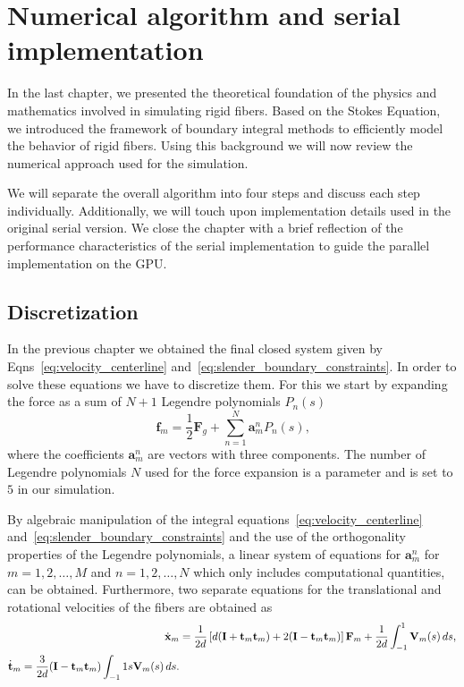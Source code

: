 \chapter{Numerical algorithm and serial implementation}
\label{cha:serial_implementation}

In the last chapter, we presented the theoretical foundation of the physics and mathematics involved in simulating rigid fibers. Based on the Stokes Equation, we introduced the framework of boundary integral methods to efficiently model the behavior of rigid fibers. Using this background we will now review the numerical approach used for the simulation.

We will separate the overall algorithm into four steps and discuss each step individually. Additionally, we will touch upon implementation details used in the original serial version. We close the chapter with a brief reflection of the performance characteristics of the serial implementation to guide the parallel implementation on the GPU.

\section{Discretization}
In the previous chapter we obtained the final closed system given by Eqns~\eqref{eq:velocity_centerline} and~\eqref{eq:slender_boundary_constraints}. In order to solve these equations we have to discretize them. For this we start by expanding the force as a sum of $N+1$ Legendre polynomials $P_n(s)$
\begin{equation}
  \label{eq:force_discretization}
  \mathbf{f}_m = \frac{1}{2}\mathbf{F}_g + \sum_{n=1}^{N}\mathbf{a}_{m}^{n} P_n(s) \text{,}
\end{equation}
where the coefficients $\mathbf{a}_m^n$ are vectors with three components. The number of Legendre polynomials $N$ used for the force expansion is a parameter and is set to $5$ in our simulation.

By algebraic manipulation of the integral equations~\eqref{eq:velocity_centerline} and~\eqref{eq:slender_boundary_constraints} and the use of the orthogonality properties of the Legendre polynomials, a linear system of equations for $\mathbf{a}_m^n$ for $m=1,2,\dots,M$ and $n=1,2,\dots,N$ which only includes computational quantities, can be obtained. Furthermore, two separate equations for the translational and rotational velocities of the fibers are obtained as 
\begin{equation}
  \begin{aligned}
	\dot{\mathbf{x}}_m &= \frac{1}{2d}\left[d(\mathbf{I}+\mathbf{t}_m\mathbf{t}_m) + 2(\mathbf{I}-\mathbf{t}_m\mathbf{t}_m)\right] \mathbf{F}_m + \frac{1}{2d} \int_{-1}^{1} \mathbf{V}_m(s) \, ds \text{,} \label{eq:delta_translate_velocity} \\
	\dot{\mathbf{t}}_m = \frac{3}{2d}(\mathbf{I}-\mathbf{t}_m\mathbf{t}_m) \int_{-1}{1}s\mathbf{V}_m(s) \, ds \text{.}\label{eq:delta_rotate_velocity}
  \end{aligned}
\end{equation}

